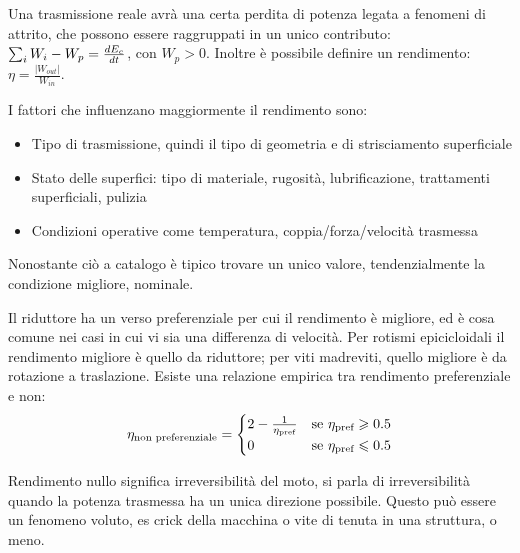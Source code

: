 
Una trasmissione reale avrà una certa perdita di potenza legata a fenomeni di attrito, che possono essere raggruppati in un unico contributo: $\sum_i W_i - W_p = \frac{dE_c}{dt}$, con $W_p>0$.
Inoltre è possibile definire un rendimento: $\eta=\frac{|W_{out}|}{W_{in}}$.

I fattori che influenzano maggiormente il rendimento sono:
\begin{itemize}
    \item Tipo di trasmissione, quindi il tipo di geometria e di strisciamento superficiale
    \item Stato delle superfici: tipo di materiale, rugosità, lubrificazione, trattamenti superficiali, pulizia
    \item Condizioni operative come temperatura, coppia/forza/velocità trasmessa
\end{itemize}
Nonostante ciò a catalogo è tipico trovare un unico valore, tendenzialmente la condizione migliore, nominale.

Il riduttore ha un verso preferenziale per cui il rendimento è migliore, ed è cosa comune nei casi in cui vi sia una differenza di velocità.
Per rotismi epicicloidali il rendimento migliore è quello da riduttore; per viti madreviti, quello migliore è da rotazione a traslazione.
Esiste una relazione empirica tra rendimento preferenziale e non:
\[
\eta_\textup{non preferenziale} = 
\begin{cases} 
    2 - \frac{1}{\eta_\textup{pref}} & \text{se } \eta_\textup{pref} \geqslant 0.5 \\
    0 & \text{se } \eta_\textup{pref} \leqslant 0.5
\end{cases}
\]

Rendimento nullo significa irreversibilità del moto, si parla di irreversibilità quando la potenza trasmessa ha un unica direzione possibile. Questo può essere un fenomeno voluto, es crick della macchina o vite di tenuta in una struttura, o meno.

